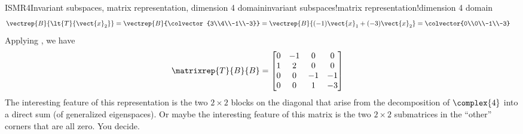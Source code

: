 \begin{example}{ISMR4}{Invariant subspaces, matrix representation, dimension 4 domain}{invariant subspaces!matrix representation!dimension 4 domain}
\begin{align*}
%
\vectrep{B}{\lt{T}{\vect{x}_2}}
&=\vectrep{B}{\colvector{3\\4\\-1\\-3}}
=\vectrep{B}{(-1)\vect{x}_1+(-3)\vect{x}_2}
=\colvector{0\\0\\-1\\-3}
%
\end{align*}
%
Applying , we have
%
\begin{align*}
\matrixrep{T}{B}{B}&=
\begin{bmatrix}
0 & -1 & 0 & 0 \\
1 & 2 & 0 & 0 \\
0 & 0 & -1 & -1 \\
0 & 0 &  1 & -3 
\end{bmatrix}
\end{align*}
%
The interesting feature of this representation is the two $2\times 2$ blocks on the diagonal that arise from the decomposition of $\complex{4}$ into a direct sum (of generalized eigenspaces).  Or maybe the interesting feature of this matrix is the two $2\times 2$ submatrices in the ``other'' corners that are all zero.  You decide.
%
\end{example}
%
%
